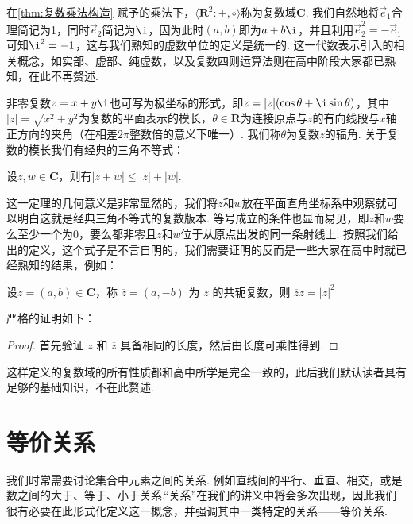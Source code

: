 在\autoref{thm:复数乘法构造} 赋予的乘法下，$\langle\mathbf{R}^2\colon+,\circ\rangle$称为复数域$\mathbf{C}$. 我们自然地将$\vec{e}_1$合理简记为1，同时$\vec{e}_2$简记为$\i$，因为此时$(a,b)$即为$a+b\i$，并且利用$\vec{e}_2^2=-\vec{e}_1$可知$\i^2=-1$，这与我们熟知的虚数单位的定义是统一的. 这一代数表示引入的相关概念，如实部、虚部、纯虚数，以及复数四则运算法则在高中阶段大家都已熟知，在此不再赘述.

非零复数$z=x+y\i$也可写为极坐标的形式，即$z=|z|(\cos\theta+\i\sin\theta)$，其中$|z|=\sqrt{x^2+y^2}$为复数的平面表示的模长，$\theta\in\mathbf{R}$为连接原点与$z$的有向线段与$x$轴正方向的夹角（在相差$2\pi$整数倍的意义下唯一）. 我们称$\theta$为复数$z$的辐角. 关于复数的模长我们有经典的三角不等式：
\begin{theorem}{}{}
    设$z,w\in\mathbf{C}$，则有$|z+w|\leqslant|z|+|w|$.
\end{theorem}

这一定理的几何意义是非常显然的，我们将$z$和$w$放在平面直角坐标系中观察就可以明白这就是经典三角不等式的复数版本. 等号成立的条件也显而易见，即$z$和$w$要么至少一个为0，要么都非零且$z$和$w$位于从原点出发的同一条射线上. 按照我们给出的定义，这个式子是不言自明的，我们需要证明的反而是一些大家在高中时就已经熟知的结果，例如：

\begin{theorem}{}{}
    设$z = (a, b) \in \mathbf{C}$，称 $\overline{z} = (a, -b)$ 为 $z$ 的共轭复数，则 $\overline{z} z = |z|^2$
\end{theorem}

严格的证明如下：

\begin{proof}
    首先验证 $z$ 和 $\overline{z}$ 具备相同的长度，然后由长度可乘性得到.
\end{proof}

这样定义的复数域的所有性质都和高中所学是完全一致的，此后我们默认读者具有足够的基础知识，不在此赘述.

\section{等价关系}

我们时常需要讨论集合中元素之间的关系. 例如直线间的平行、垂直、相交，或是数之间的大于、等于、小于关系.``关系''在我们的讲义中将会多次出现，因此我们很有必要在此形式化定义这一概念，并强调其中一类特定的关系——等价关系.

